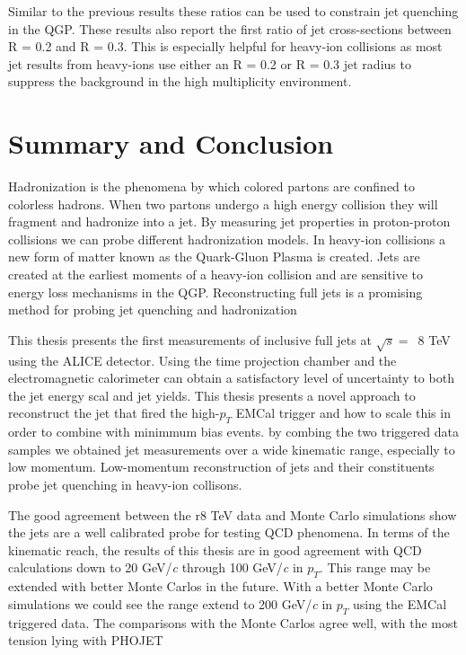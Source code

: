 Similar to the previous results these ratios can be used to constrain jet quenching in the QGP.  These results also report the first ratio of jet cross-sections between R = 0.2 and R = 0.3.  This is especially helpful for heavy-ion collisions as most jet results from heavy-ions use either an R = 0.2 or R = 0.3 jet radius to suppress the background in the high multiplicity environment.


\section{Summary and Conclusion}

Hadronization is the phenomena by which colored partons are confined to colorless hadrons.  When two partons undergo a high energy collision they will fragment and hadronize into a jet.  By measuring jet properties in proton-proton collisions we can probe different hadronization models.  In heavy-ion collisions a new form of matter known as the Quark-Gluon Plasma is created.  Jets are created at the earliest moments of a heavy-ion collision and are sensitive to energy loss mechanisms in the QGP.  Reconstructing full jets is a promising method for probing jet quenching and hadronization

This thesis presents the first measurements of inclusive full jets at $\sqrt{s} = \,$ 8 TeV using the ALICE detector.  Using the time projection chamber and the electromagnetic calorimeter can obtain a satisfactory level of uncertainty to both the jet energy scal and jet yields.  This thesis presents a novel approach to reconstruct the jet that fired the high-$p_{T}$ EMCal trigger and how to scale this in order to combine with minimmum bias events.  by combing the two triggered data samples we obtained jet measurements over a wide kinematic range, especially to low momentum.  Low-momentum reconstruction of jets and their constituents probe jet quenching in heavy-ion collisons.

The good agreement between the r8 TeV data and Monte Carlo simulations show the jets are a well calibrated probe for testing QCD phenomena.  In terms of the kinematic reach, the results of this thesis are in good agreement with QCD calculations down to 20 GeV/\textit{c} through 100 GeV/\textit{c} in $p_{T}$.  This range may be extended with better Monte Carlos in the future.  With a better Monte Carlo simulations we could see the range extend to 200 GeV/\textit{c} in $p_{T}$ using the EMCal triggered data.  The comparisons with the Monte Carlos agree well, with the most tension lying with PHOJET

